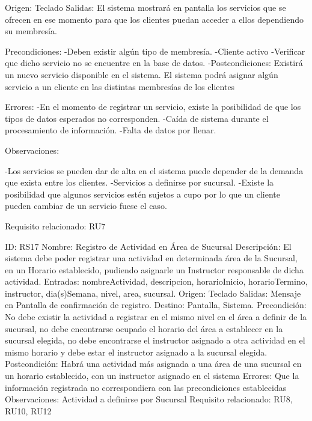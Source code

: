Origen: Teclado
Salidas: El sistema mostrará en pantalla los servicios que se ofrecen en ese momento para que los clientes puedan acceder a ellos dependiendo su membresía.

Precondiciones:
-Deben existir algún tipo de membresía.
-Cliente activo
-Verificar que dicho servicio no se encuentre en la base de datos.
-Postcondiciones:
             Existirá un nuevo servicio disponible en el sistema.
         El sistema podrá asignar algún servicio a un cliente en las distintas membresías de     los clientes 
 
Errores:
 -En el momento de registrar un servicio, existe la posibilidad de que los tipos   de datos esperados  no corresponden.
-Caída de sistema durante el procesamiento de información.
-Falta de datos por llenar.

Observaciones:

-Los servicios se pueden dar de alta en el sistema puede depender de la demanda que exista entre los clientes. 
-Servicios a definirse por sucursal.
-Existe la posibilidad que algunos servicios estén sujetos a cupo por lo que un cliente pueden cambiar de un servicio fuese el caso.

Requisito relacionado: RU7


ID: RS17
Nombre: Registro de Actividad en Área de Sucursal
Descripción: El sistema debe poder registrar una actividad en determinada área de la Sucursal, en un Horario establecido, pudiendo asignarle un Instructor responsable de dicha actividad.
Entradas: nombreActividad, descripcion, horarioInicio, horarioTermino, instructor, dia(s)Semana, nivel, area, sucursal. 
Origen: Teclado
Salidas: Mensaje en Pantalla de confirmación de registro. 
Destino: Pantalla, Sistema.
Precondición: No debe existir la actividad a registrar en el mismo nivel en el área a definir de la sucursal, no debe encontrarse ocupado el horario del área a establecer en la sucursal elegida, no debe encontrarse el instructor asignado a otra actividad en el mismo horario y debe estar el instructor asignado a la sucursal elegida.
Postcondición: Habrá una actividad más asignada a una área de una sucursal en un horario establecido, con un instructor asignado en el sistema
Errores: Que la información registrada no correspondiera con las precondiciones establecidas
Observaciones: Actividad a definirse por Sucursal
Requisito relacionado: RU8, RU10, RU12

